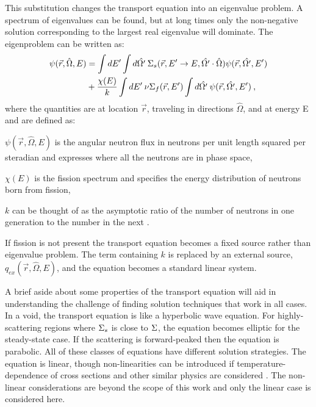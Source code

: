 This substitution changes the transport equation into an eigenvalue problem. A spectrum of eigenvalues can be found, but at long times only the non-negative solution corresponding to the largest real eigenvalue will dominate. The eigenproblem can be written as:
%
\begin{align}
   [\hat{\Omega} \cdot \nabla + \Macro(\vec{r}, E)] \psi(\vec{r}, \hat{\Omega}, E)  &=  \int dE' \int d\hat{\Omega'} \:\Macro_{s}(\vec{r}, E' \to E, \hat{\Omega'} \cdot \hat{\Omega}) \psi(\vec{r}, \hat{\Omega'}, E') \nonumber \\
&+\frac{ \chi(E)}{k} \int dE' \:\nu \Macro_{f}(\vec{r}, E') \int d\hat{\Omega'} \:\psi(\vec{r}, \hat{\Omega'}, E') \:,
\label{eq:neutron transport}
\end{align}
%
\noindent where the quantities are at location $\vec{r}$, traveling in directions $\hat{\Omega}$, and at energy E and are defined as:
\begin{list}{}{\hspace{2em}}
  \item $\psi(\vec{r}, \hat{\Omega}, E)$ is the angular neutron flux in neutrons per unit length squared per steradian and expresses where all the neutrons are in phase space, 
  \item $\chi(E)$ is the fission spectrum and specifies the energy distribution of neutrons born from fission,
  \item $k$ can be thought of as the asymptotic ratio of the number of neutrons in one generation to the number in the next \cite{Lewis1993}.
\end{list}

If fission is not present the transport equation becomes a fixed source rather than eigenvalue problem. The term containing $k$ is replaced by an external source, $q_{ex}(\vec{r}, \hat{\Omega}, E)$, and the equation becomes a standard linear system. 

A brief aside about some properties of the transport equation will aid in understanding the challenge of finding solution techniques that work in all cases. In a void, the transport equation is like a hyperbolic wave equation. For highly-scattering regions where $\Sigma_{s}$ is close to $\Sigma$, the equation becomes elliptic for the steady-state case. If the scattering is forward-peaked then the equation is parabolic. All of these classes of equations have different solution strategies. The equation is linear, though non-linearities can be introduced if temperature-dependence of cross sections and other similar physics are considered \cite{Adams2002}.  The non-linear considerations are beyond the scope of this work and only the linear case is considered here.

